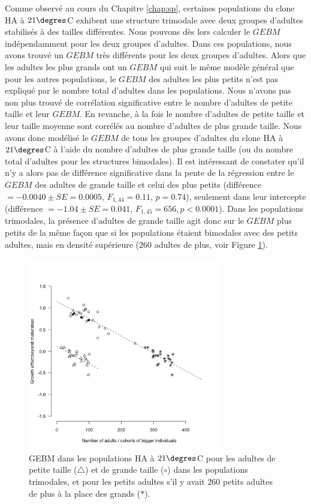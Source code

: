 Comme observé au cours du Chapitre \ref{chap:sp}, certaines populations du clone
HA à $21\degres$C exhibent une structure trimodale avec deux groupes d'adultes
stabilisés à des tailles différentes. Nous pouvons dès lors calculer le $GEBM$
indépendamment pour les deux groupes d'adultes.
Dans ces populations, nous avons trouvé un $GEBM$ très différents pour les deux groupes d'adultes. Alors que les adultes
les plus grands ont un $GEBM$ qui suit le même modèle général que pour les
autres populations, le $GEBM$ des adultes les plus petits n'est pas expliqué par
le nombre total d'adultes dans les populations. Nous n'avons pas non plus trouvé
de corrélation significative entre le nombre d'adultes de petite taille et leur
$GEBM$. En revanche, à la fois le nombre d'adultes de petite taille et leur
taille moyenne sont corrélés au nombre d'adultes de plus grande taille. Nous
avons donc modélisé le $GEBM$ de tous les groupes d'adultes du clone HA à
$21\degres$C à l'aide du nombre d'adultes de plus grande taille (ou du nombre
total d'adultes pour les structures bimodales). Il est intéressant de constater
qu'il n'y a alors pas de différence significative dans la pente de la régression
entre le $GEBM$ des adultes de grande taille et celui des plus petits
(différence $=-0.0040 \pm SE = 0.0005$, $F_{1,44} = 0.11$, $p = 0.74$),
seulement dans leur intercepte (différence $=-1.04 \pm SE = 0.041$, $F_{1,45} =
656, p < 0.0001$). Dans les populations trimodales, la présence d'adultes de
grande taille agit donc sur le $GEBM$ plus petits de la même façon que si les
populations étaient bimodales avec des petits adultes, mais en densité
supérieure ($260$ adultes de plus, voir Figure \ref{fig:FIP6}).

\begin{figure}[!ht]
\begin{center}
\includegraphics[width=0.75\textwidth]{1_CorpsDeThese/Resumes/Fig/FIP06}
\caption[GEBM dans les
populations HA à $21\degres$C]{GEBM dans les
populations HA à $21\degres$C pour les adultes de petite taille ($\triangle$) et
de grande taille ($\circ$) dans les populations trimodales, et pour les petits
adultes s'il y avait 260 petits adultes de plus à la place des grands ($\ast$).}
\label{fig:FIP6}
\end{center}
\end{figure}

